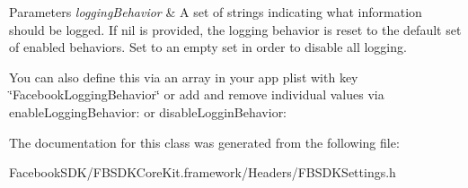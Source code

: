 \begin{DoxyParams}{Parameters}
{\em logging\-Behavior} & A set of strings indicating what information should be logged. If nil is provided, the logging behavior is reset to the default set of enabled behaviors. Set to an empty set in order to disable all logging.\\
\hline
\end{DoxyParams}
You can also define this via an array in your app plist with key \char`\"{}\-Facebook\-Logging\-Behavior\char`\"{} or add and remove individual values via enable\-Logging\-Behavior\-: or disable\-Loggin\-Behavior\-: 

The documentation for this class was generated from the following file\-:\begin{DoxyCompactItemize}
\item 
Facebook\-S\-D\-K/\-F\-B\-S\-D\-K\-Core\-Kit.\-framework/\-Headers/F\-B\-S\-D\-K\-Settings.\-h\end{DoxyCompactItemize}
